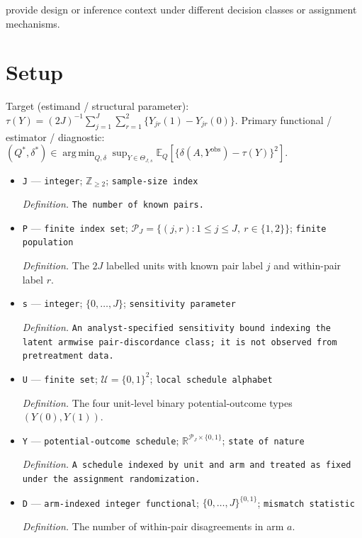 \documentclass{article}
\begin{document}
provide design or inference context under different decision classes or assignment mechanisms.

\section{Setup}

Target (estimand / structural parameter): \(\tau(Y)=(2J)^{-1}\sum_{j=1}^J\sum_{r=1}^2\{Y_{jr}(1)-Y_{jr}(0)\}\).
Primary functional / estimator / diagnostic: \((Q^*,\delta^*)\in\operatorname*{arg\,min}_{Q,\delta}\sup_{Y\in\Theta_{J,s}}\mathbb E_Q[\{\delta(A,Y^{\mathrm{obs}})-\tau(Y)\}^2]\).
\begin{itemize}
  \item \texttt{J} --- \texttt{integer}; \(\mathbb Z_{\ge 2}\); \texttt{sample-\allowbreak{}size index}
  \par\smallskip\noindent\emph{Definition.} \texttt{The number of known pairs.}
  \item \texttt{P} --- \texttt{finite index set}; \(\mathcal P_J=\{(j,r):1\le j\le J,\ r\in\{1,2\}\}\); \texttt{finite population}
  \par\smallskip\noindent\emph{Definition.} The \(2J\) labelled units with known pair label \(j\) and within-pair label \(r\).
  \item \texttt{s} --- \texttt{integer}; \(\{0,\ldots,J\}\); \texttt{sensitivity parameter}
  \par\smallskip\noindent\emph{Definition.} \texttt{An analyst-\allowbreak{}specified sensitivity bound indexing the latent armwise pair-\allowbreak{}discordance class;\allowbreak{} it is not observed from pretreatment data.}
  \item \texttt{U} --- \texttt{finite set}; \(\mathcal U=\{0,1\}^2\); \texttt{local schedule alphabet}
  \par\smallskip\noindent\emph{Definition.} The four unit-level binary potential-outcome types \((Y(0),Y(1))\).
  \item \texttt{Y} --- \texttt{potential-\allowbreak{}outcome schedule}; \(\mathbb R^{\mathcal P_J\times\{0,1\}}\); \texttt{state of nature}
  \par\smallskip\noindent\emph{Definition.} \texttt{A schedule indexed by unit and arm and treated as fixed under the assignment randomization.}
  \item \texttt{D} --- \texttt{arm-\allowbreak{}indexed integer functional}; \(\{0,\ldots,J\}^{\{0,1\}}\); \texttt{mismatch statistic}
  \par\smallskip\noindent\emph{Definition.} The number of within-pair disagreements in arm \(a\).

\end{itemize}
\end{document}
